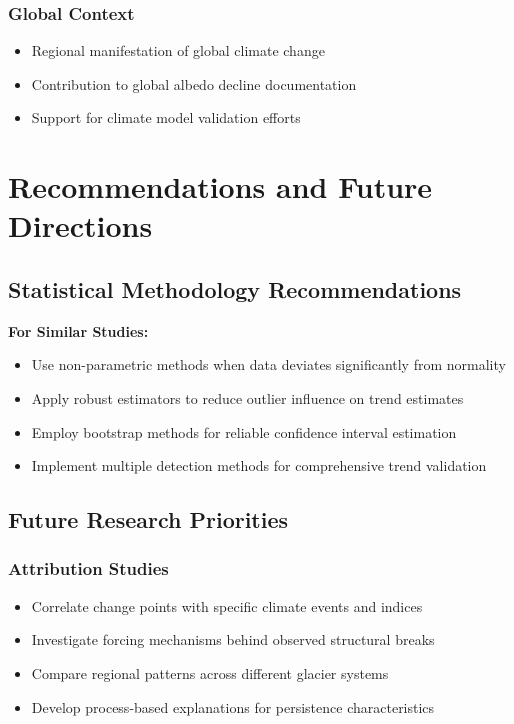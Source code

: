 \documentclass[12pt,a4paper]{article}
\begin{document}
\subsubsection{Global Context}
\begin{itemize}
    \item Regional manifestation of global climate change
    \item Contribution to global albedo decline documentation
    \item Support for climate model validation efforts
\end{itemize}

\section{Recommendations and Future Directions}

\subsection{Statistical Methodology Recommendations}

\textbf{For Similar Studies:}
\begin{itemize}
    \item Use non-parametric methods when data deviates significantly from normality
    \item Apply robust estimators to reduce outlier influence on trend estimates
    \item Employ bootstrap methods for reliable confidence interval estimation
    \item Implement multiple detection methods for comprehensive trend validation
\end{itemize}

\subsection{Future Research Priorities}

\subsubsection{Attribution Studies}
\begin{itemize}
    \item Correlate change points with specific climate events and indices
    \item Investigate forcing mechanisms behind observed structural breaks
    \item Compare regional patterns across different glacier systems
    \item Develop process-based explanations for persistence characteristics
\end{itemize}
\end{document}
